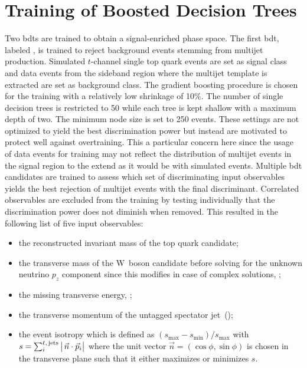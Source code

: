 \section{Training of Boosted Decision Trees}
\label{sec:polarization-bdt-training}

Two \glspl{bdt} are trained to obtain a signal-enriched phase space. The first \gls{bdt}, labeled \bdtqcd, is trained to reject background events stemming from multijet production. Simulated $t$-channel single top quark events are set as signal class and data events from the sideband region where the multijet template is extracted are set as background class. The gradient boosting procedure is chosen for the training with a relatively low shrinkage of 10\%. The number of single decision trees is restricted to 50 while each tree is kept shallow with a maximum depth of two. The minimum node size is set to 250 events. These settings are not optimized to yield the best discrimination power but instead are motivated to protect well against overtraining. This a particular concern here since the usage of data events for training may not reflect the distribution of multijet events in the signal region to the extend as it would be with simulated events. Multiple \gls{bdt} candidates are trained to assess which set of discriminating input observables yields the best rejection of multijet events with the final discriminant. Correlated observables are excluded from the training by testing individually that the discrimination power does not diminish when removed. This resulted in the following list of five input observables:

\begin{itemize}
\item the reconstructed invariant mass of the top quark candidate;
\item the transverse mass of the W~boson candidate before solving for the unknown neutrino $p_{z}$ component since this modifies \pvmiss in case of complex solutions, \mtw;
\item the missing transverse energy, \met;
\item the transverse momentum of the untagged spectator jet~(\jprime);
\item the event isotropy which is defined as $(s_\mathrm{max}-s_\mathrm{min})/s_\mathrm{max}$ with $s=\sum_{i}^\scriptn{\ell,\,\mathrm{jets}}\big|\,\vec{n}\cdot\vec{p}_{i}\big|$ where the unit vector $\vec{n}=(\cos\phi,\sin\phi)$ is chosen in the transverse plane such that it either maximizes or minimizes $s$.
\end{itemize}


